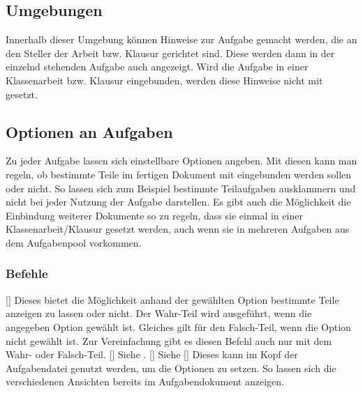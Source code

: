 \subsection{Umgebungen}
\begin{environments}
        Innerhalb dieser Umgebung können Hinweise zur Aufgabe gemacht werden, die an den Steller der Arbeit bzw. Klausur gerichtet sind. Diese werden dann in der einzelnd stehenden Aufgabe auch angezeigt. Wird die Aufgabe in einer Klassenarbeit bzw. Klausur eingebunden, werden diese Hinweise nicht mit gesetzt.
\end{environments}

\subsection{Optionen an Aufgaben}\label{sec:optionen_aufgabenpool}
Zu jeder Aufgabe lassen sich einstellbare Optionen angeben. Mit diesen kann man regeln, ob bestimmte Teile im fertigen Dokument mit eingebunden werden sollen oder nicht. So lassen sich zum Beispiel bestimmte Teilaufgaben ausklammern und nicht bei jeder Nutzung der Aufgabe darstellen. Es gibt auch die Möglichkeit die Einbindung weiterer Dokumente so zu regeln, dass sie einmal in einer Klassenarbeit/Klausur gesetzt werden, auch wenn sie in mehreren Aufgaben aus dem Aufgabenpool vorkommen.

\subsubsection{Befehle}
\begin{commands}
    []
        Dieses bietet die Möglichkeit anhand der gewählten Option bestimmte Teile anzeigen zu lassen oder nicht. Der Wahr-Teil wird ausgeführt, wenn die angegeben Option gewählt ist. Gleiches gilt für den Falsch-Teil, wenn die Option nicht gewählt ist. Zur Vereinfachung gibt es diesen Befehl auch nur mit dem Wahr- oder Falsch-Teil.
    []
        Siehe .
    []
        Siehe 
    []
        Dieses kann im Kopf der Aufgabendatei genutzt werden, um die Optionen zu setzen. So lassen sich die verschiedenen Ansichten bereits im Aufgabendokument anzeigen.
\end{commands}

